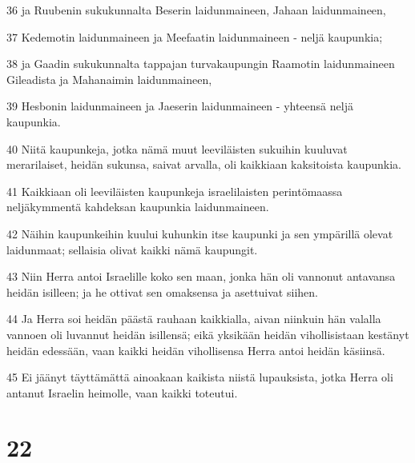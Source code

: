 \par 36 ja Ruubenin sukukunnalta Beserin laidunmaineen, Jahaan laidunmaineen,
\par 37 Kedemotin laidunmaineen ja Meefaatin laidunmaineen - neljä kaupunkia;
\par 38 ja Gaadin sukukunnalta tappajan turvakaupungin Raamotin laidunmaineen Gileadista ja Mahanaimin laidunmaineen,
\par 39 Hesbonin laidunmaineen ja Jaeserin laidunmaineen - yhteensä neljä kaupunkia.
\par 40 Niitä kaupunkeja, jotka nämä muut leeviläisten sukuihin kuuluvat merarilaiset, heidän sukunsa, saivat arvalla, oli kaikkiaan kaksitoista kaupunkia.
\par 41 Kaikkiaan oli leeviläisten kaupunkeja israelilaisten perintömaassa neljäkymmentä kahdeksan kaupunkia laidunmaineen.
\par 42 Näihin kaupunkeihin kuului kuhunkin itse kaupunki ja sen ympärillä olevat laidunmaat; sellaisia olivat kaikki nämä kaupungit.
\par 43 Niin Herra antoi Israelille koko sen maan, jonka hän oli vannonut antavansa heidän isilleen; ja he ottivat sen omaksensa ja asettuivat siihen.
\par 44 Ja Herra soi heidän päästä rauhaan kaikkialla, aivan niinkuin hän valalla vannoen oli luvannut heidän isillensä; eikä yksikään heidän vihollisistaan kestänyt heidän edessään, vaan kaikki heidän vihollisensa Herra antoi heidän käsiinsä.
\par 45 Ei jäänyt täyttämättä ainoakaan kaikista niistä lupauksista, jotka Herra oli antanut Israelin heimolle, vaan kaikki toteutui.

\chapter{22}

